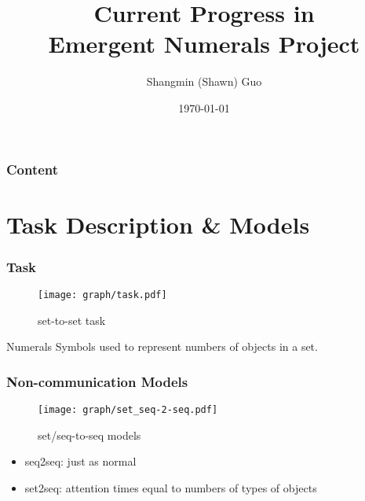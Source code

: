 \documentclass[compress,mathserif,xcolor=dvipsnames,svgnames,aspectratio=43]{beamer}
\begin{document}
\title{\huge{Current Progress in \\ Emergent Numerals Project}\\\medskip
    \large\textcolor{beautyblue}{} \medskip}
\author{\textcolor{grizoo}{Shangmin (Shawn) Guo}}
\date[someday\ldots]{\today}%

\begin{frame}
\titlepage
\end{frame}

\begin{frame}
\frametitle{Content}
\tableofcontents
\end{frame}

\section{Task Description \& Models}

\begin{frame}[c]
  \frametitle{Task}
  \begin{figure}[!ht]
    \centering
    \texttt{[image: graph/task.pdf]}
    \caption{set-to-set task}
    \label{fig:1task}
  \end{figure}
  \begin{block}{Numerals}
    Symbols used to represent numbers of objects in a set.
  \end{block}
\end{frame}

\begin{frame}[c]
  \frametitle{Non-communication Models}
  \begin{figure}[!ht]
    \centering
    \texttt{[image: graph/set\_seq-2-seq.pdf]}
    \caption{set/seq-to-seq models}
    \label{fig:2set_seq2seq}
  \end{figure}
  \begin{itemize}
    \item seq2seq: just as normal
    \item set2seq: attention times equal to numbers of types of objects
  \end{itemize}
\end{frame}
\end{document}
